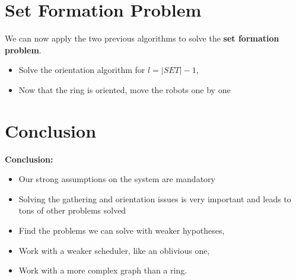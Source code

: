 \documentclass{beamer}
\begin{document}
\section{Set Formation Problem}
\begin{frame}
	We can now apply the two previous algorithms to solve the \textbf{set formation problem}.
\end{frame}

\begin{frame}
	\begin{itemize}
		\item<1-> Solve the orientation algorithm for $l = |SET| - 1$,
		\item<2-> Now that the ring is oriented, move the robots one by one
	\end{itemize}
	
\end{frame}


\section{Conclusion}
\begin{frame}
	\textbf{Conclusion:}
	\begin{itemize}
		\item<2-> Our strong assumptions on the system are mandatory
		\item<3-> Solving the gathering and orientation issues is very important and leads to tons of other problems solved
	\end{itemize}
	
	\begin{itemize}
		\item<5-> Find the problems we can solve with weaker hypotheses,
		\item<6-> Work with a weaker scheduler, like an oblivious one,
		\item<7-> Work with a more complex graph than a ring.
	\end{itemize}
	
\end{frame}
\end{document}
